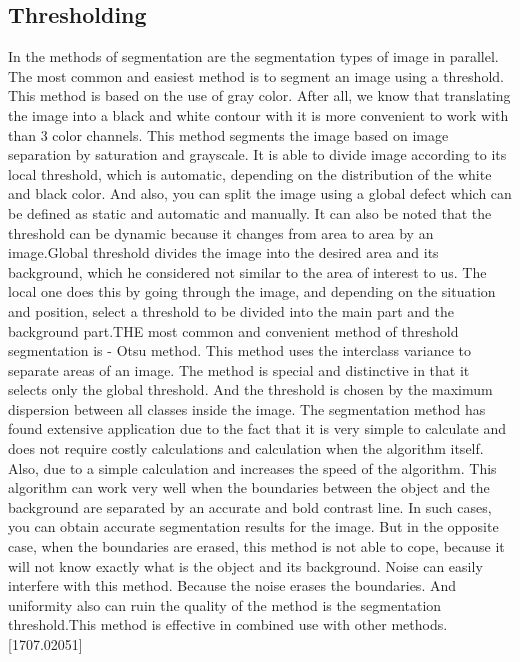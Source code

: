 \vspace{-0.3cm}

\subsection{Thresholding}\label{sec:3.4.1}
\vspace{-0.5cm}
\noindent In the methods of segmentation are the segmentation types of image in parallel. The most common and easiest method is to segment an image using a threshold. This method is based on the use of gray color. After all, we know that translating the image into a black and white contour with it is more convenient to work with than 3 color channels. This method segments the image based on image separation by saturation and grayscale. It is able to divide image according to its local threshold, which is automatic, depending on the distribution of the white and black color. And also, you can split the image using a global defect which can be defined as static and automatic and manually. It can also be noted that the threshold can be dynamic because it changes from area to area by an image.Global threshold divides the image into the desired area and its background, which he considered not similar to the area of interest to us. The local one does this by going through the image, and depending on the situation and position, select a threshold to be divided into the main part and the background part.THE most common and convenient method of threshold segmentation is - Otsu method. This method uses the interclass variance to separate areas of an image. The method is special and distinctive in that it selects only the global threshold. And the threshold is chosen by the maximum dispersion between all classes inside the image. The segmentation method has found extensive application due to the fact that it is very simple to calculate and does not require costly calculations and calculation when the algorithm itself. Also, due to a simple calculation and increases the speed of the algorithm. This algorithm can work very well when the boundaries between the object and the background are separated by an accurate and bold contrast line. In such cases, you can obtain accurate segmentation results for the image. But in the opposite case, when the boundaries are erased, this method is not able to cope, because it will not know exactly what is the object and its background. Noise can easily interfere with this method. Because the noise erases the boundaries. And uniformity also can ruin the quality of the method is the segmentation threshold.This method is effective in combined use with other methods.[1707.02051]


